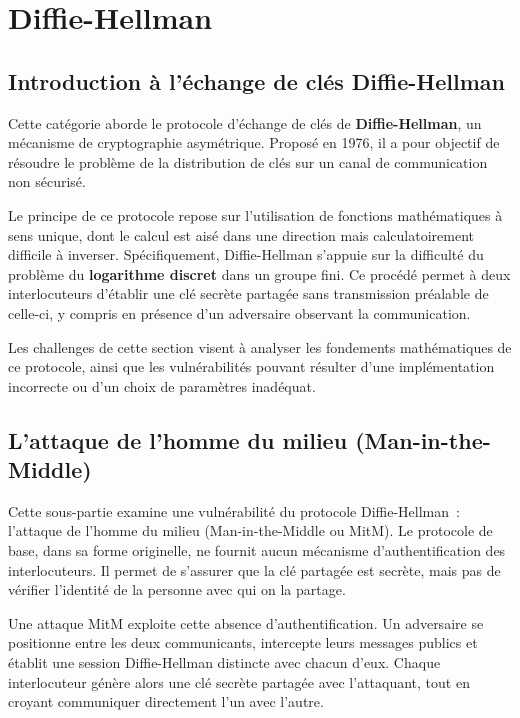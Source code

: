     \section{Diffie-Hellman}
    \subsection{Introduction à l'échange de clés Diffie-Hellman}
    Cette catégorie aborde le protocole d'échange de clés de
    \textbf{Diffie-Hellman}, un mécanisme de cryptographie asymétrique.
    Proposé en 1976, il a pour objectif de résoudre le problème de la
    distribution de clés sur un canal de communication non sécurisé.

    Le principe de ce protocole repose sur l'utilisation de fonctions
    mathématiques à sens unique, dont le calcul est aisé dans une direction
    mais calculatoirement difficile à inverser. Spécifiquement, Diffie-Hellman
    s'appuie sur la difficulté du problème du \textbf{logarithme discret} dans
    un groupe fini. Ce procédé permet à deux interlocuteurs d'établir une clé
    secrète partagée sans transmission préalable de celle-ci, y compris en
    présence d'un adversaire observant la communication.

    Les challenges de cette section visent à analyser les fondements
    mathématiques de ce protocole, ainsi que les vulnérabilités pouvant
    résulter d'une implémentation incorrecte ou d'un choix de paramètres
    inadéquat.

    \subsection{L'attaque de l'homme du milieu (Man-in-the-Middle)}
    Cette sous-partie examine une vulnérabilité du protocole Diffie-Hellman~:
    l'attaque de l'homme du milieu (Man-in-the-Middle ou MitM). Le protocole de
    base, dans sa forme originelle, ne fournit aucun mécanisme d'authentification
    des interlocuteurs. Il permet de s'assurer que la clé partagée est secrète,
    mais pas de vérifier l'identité de la personne avec qui on la partage.

    Une attaque MitM exploite cette absence d'authentification. Un adversaire
    se positionne entre les deux communicants, intercepte leurs messages publics
    et établit une session Diffie-Hellman distincte avec chacun d'eux. Chaque
    interlocuteur génère alors une clé secrète partagée avec l'attaquant, tout
    en croyant communiquer directement l'un avec l'autre.

